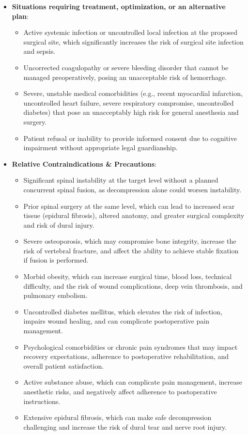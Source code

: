 \begin{itemize}
      \item \textbf{Situations requiring treatment, optimization, or an alternative plan}:
    \begin{itemize}
      \item Active systemic infection or uncontrolled local infection at the proposed surgical site, which significantly increases the risk of surgical site infection and sepsis.
      \item Uncorrected coagulopathy or severe bleeding disorder that cannot be managed preoperatively, posing an unacceptable risk of hemorrhage.
      \item Severe, unstable medical comorbidities (e.g., recent myocardial infarction, uncontrolled heart failure, severe respiratory compromise, uncontrolled diabetes) that pose an unacceptably high risk for general anesthesia and surgery.
      \item Patient refusal or inability to provide informed consent due to cognitive impairment without appropriate legal guardianship.
    \end{itemize}
  \item \textbf{Relative Contraindications \& Precautions}:
    \begin{itemize}
      \item Significant spinal instability at the target level without a planned concurrent spinal fusion, as decompression alone could worsen instability.
      \item Prior spinal surgery at the same level, which can lead to increased scar tissue (epidural fibrosis), altered anatomy, and greater surgical complexity and risk of dural injury.
      \item Severe osteoporosis, which may compromise bone integrity, increase the risk of vertebral fracture, and affect the ability to achieve stable fixation if fusion is performed.
      \item Morbid obesity, which can increase surgical time, blood loss, technical difficulty, and the risk of wound complications, deep vein thrombosis, and pulmonary embolism.
      \item Uncontrolled diabetes mellitus, which elevates the risk of infection, impairs wound healing, and can complicate postoperative pain management.
      \item Psychological comorbidities or chronic pain syndromes that may impact recovery expectations, adherence to postoperative rehabilitation, and overall patient satisfaction.
      \item Active substance abuse, which can complicate pain management, increase anesthetic risks, and negatively affect adherence to postoperative instructions.
      \item Extensive epidural fibrosis, which can make safe decompression challenging and increase the risk of dural tear and nerve root injury.
    \end{itemize}
\end{itemize}

